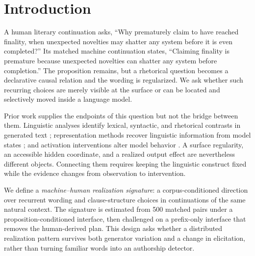 \section{Introduction}

A human literary continuation asks, ``Why prematurely claim to have reached finality, when unexpected novelties may shatter any system before it is even completed?'' Its matched machine continuation states, ``Claiming finality is premature because unexpected novelties can shatter any system before completion.'' The proposition remains, but a rhetorical question becomes a declarative causal relation and the wording is regularized. We ask whether such recurring choices are merely visible at the surface or can be located and selectively moved inside a language model.

Prior work supplies the endpoints of this question but not the bridge between them. Linguistic analyses identify lexical, syntactic, and rhetorical contrasts in generated text \citep{zamaraeva2025comparing,zanotto2025profiling,reinhart2025variation}; representation methods recover linguistic information from model states \citep{hewitt2019probe}; and activation interventions alter model behavior \citep{rimsky2024caa}. A surface regularity, an accessible hidden coordinate, and a realized output effect are nevertheless different objects. Connecting them requires keeping the linguistic construct fixed while the evidence changes from observation to intervention.

We define a \emph{machine--human realization signature}: a corpus-conditioned direction over recurrent wording and clause-structure choices in continuations of the same natural context. The signature is estimated from 500 matched pairs under a proposition-conditioned interface, then challenged on a prefix-only interface that removes the human-derived plan. This design asks whether a distributed realization pattern survives both generator variation and a change in elicitation, rather than turning familiar words into an authorship detector.

